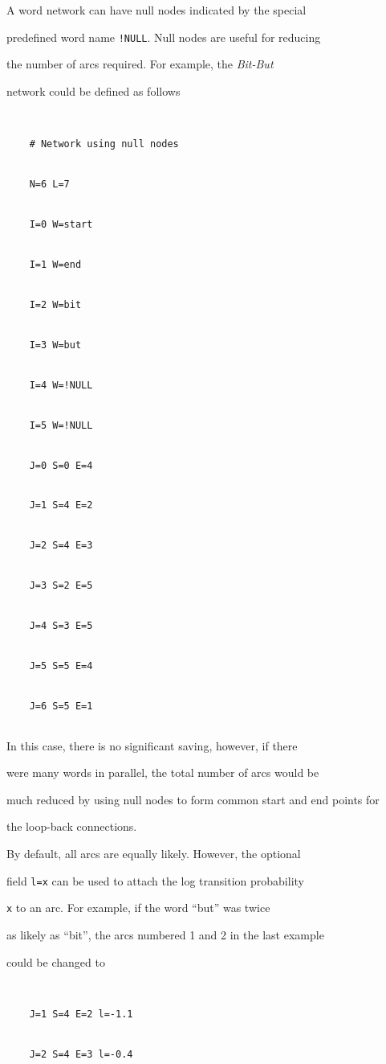 A word network can have null nodes indicated by the special


predefined word name \texttt{!NULL}.  Null nodes are useful for reducing


the number of arcs required.  For example, the \textit{Bit-But}


network could be defined as follows


\begin{verbatim}


    # Network using null nodes


    N=6 L=7


    I=0 W=start


    I=1 W=end


    I=2 W=bit


    I=3 W=but


    I=4 W=!NULL


    I=5 W=!NULL


    J=0 S=0 E=4


    J=1 S=4 E=2


    J=2 S=4 E=3


    J=3 S=2 E=5


    J=4 S=3 E=5


    J=5 S=5 E=4


    J=6 S=5 E=1


\end{verbatim}


In this case, there is no significant saving, however, if there


were many words in parallel, the total number of arcs would be


much reduced by using null nodes to form common start and end points for


the loop-back connections.





By default, all arcs are equally likely.  However, the optional


field \texttt{l=x} can be used to attach the log transition probability


\texttt{x} to an arc.  For example, if the word ``but'' was twice


as likely as ``bit'', the arcs numbered 1 and 2 in the last example


could be changed to


\begin{verbatim}


    J=1 S=4 E=2 l=-1.1


    J=2 S=4 E=3 l=-0.4


\end{verbatim}


